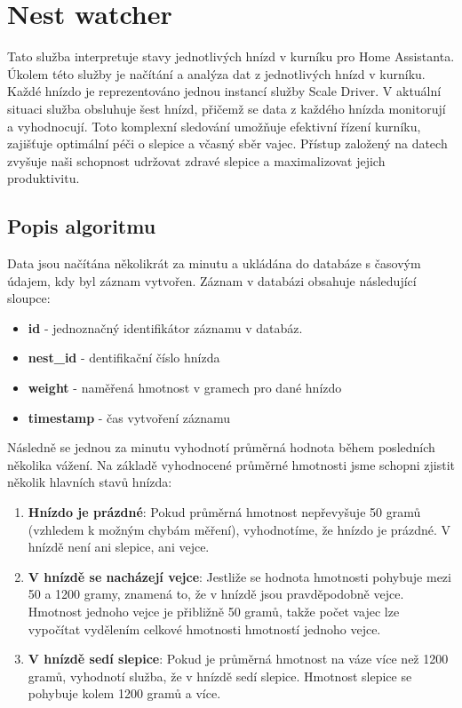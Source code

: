 \section{Nest watcher}\label{sec:nest-watcher}
Tato služba interpretuje stavy jednotlivých hnízd v kurníku pro Home Assistanta.
Úkolem této služby je načítání a analýza dat z jednotlivých hnízd v kurníku.
Každé hnízdo je reprezentováno jednou instancí služby Scale Driver.\newline
V aktuální situaci služba obsluhuje šest hnízd, přičemž se data z každého hnízda monitorují a vyhodnocují.
Toto komplexní sledování umožňuje efektivní řízení kurníku, zajišťuje optimální péči o slepice a včasný sběr vajec.
Přístup založený na datech zvyšuje naši schopnost udržovat zdravé slepice a maximalizovat jejich produktivitu.\newline

\subsection*{Popis algoritmu}

Data jsou načítána několikrát za minutu a ukládána do databáze s časovým údajem, kdy byl záznam vytvořen.
Záznam v databázi obsahuje následující sloupce:

\begin{itemize}
    \item \textbf{id} - jednoznačný identifikátor záznamu v databáz.
    \item \textbf{nest\_id} - dentifikační číslo hnízda
    \item \textbf{weight} -  naměřená hmotnost v gramech pro dané hnízdo
    \item \textbf{timestamp} - čas vytvoření záznamu
\end{itemize}

Následně se jednou za minutu vyhodnotí průměrná hodnota během posledních několika vážení.
Na základě vyhodnocené průměrné hmotnosti jsme schopni zjistit několik hlavních stavů hnízda:

\begin{enumerate}
    \item \textbf{Hnízdo je prázdné}: Pokud průměrná hmotnost nepřevyšuje 50 gramů (vzhledem k možným chybám měření), vyhodnotíme, že hnízdo je prázdné.
    V hnízdě není ani slepice, ani vejce.
    \item \textbf{V hnízdě se nacházejí vejce}: Jestliže se hodnota hmotnosti pohybuje mezi 50 a 1200 gramy, znamená to, že v hnízdě jsou pravděpodobně vejce.
    Hmotnost jednoho vejce je přibližně 50 gramů, takže počet vajec lze vypočítat vydělením celkové hmotnosti hmotností jednoho vejce.
    \item \textbf{V hnízdě sedí slepice}: Pokud je průměrná hmotnost na váze více než 1200 gramů, vyhodnotí služba, že v hnízdě sedí slepice.
    Hmotnost slepice se pohybuje kolem 1200 gramů a více.
\end{enumerate}

